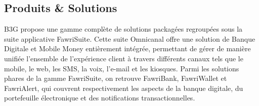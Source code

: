 


 





\subsection{Produits \& Solutions}

\hspace{\parindent}B3G propose une gamme complète de solutions packagées regroupées sous la suite applicative FawriSuite. Cette suite Omnicanal offre une solution de Banque Digitale et Mobile Money entièrement intégrée, permettant de gérer de manière unifiée l'ensemble de l'expérience client à travers différents canaux tels que le mobile, le web, les SMS, la voix, l'e-mail et les kiosques. Parmi les solutions phares de la gamme FawriSuite, on retrouve FawriBank, FawriWallet et FawriAlert, qui couvrent respectivement les aspects de la banque digitale, du portefeuille électronique et des notifications transactionnelles.

